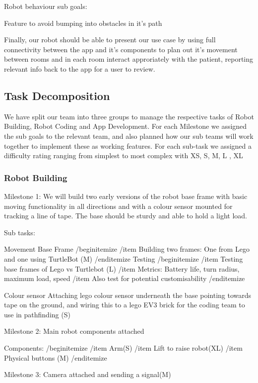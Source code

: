 \documentclass{article}
\begin{document}
Robot behaviour sub goals:

Feature to avoid bumping into obstacles in it's path

Finally, our robot should be able to present our use case by using full connectivity between the app and it's components to plan out it's movement between rooms and in each room interact approriately with the patient, reporting relevant info back to the app for a user to review.


\subsection{Task Decomposition}

We have split our team into three groups to manage the respective tasks of Robot Building, Robot Coding and App Development. For each Milestone we assigned the sub goals to the relevant team, and also planned how our sub teams will work together to implement these as working features.
For each sub-task we assigned a difficulty rating ranging from simplest to most complex with XS, S, M, L , XL


\subsubsection{Robot Building}

Milestone 1: We will build two early versions of the robot base frame with basic moving functionality in all directions and with a colour sensor mounted for tracking a line of tape. The base should be sturdy and able to hold a light load. 

Sub tasks:

Movement Base Frame
/begin{itemize}
/item Building two frames: One from Lego and one using TurtleBot (M)
/end{itemize}
Testing
/begin{itemize}
/item Testing base frames of Lego vs Turtlebot (L)
/item Metrics: Battery life, turn radius, maximum load, speed
/item Also test for potential customisability
/end{itemize}
    
Colour sensor
    Attaching lego colour sensor underneath the base pointing towards tape on the ground, and wiring this to a lego EV3 brick for the       coding team to use in pathfinding (S)
    
Milestone 2: Main robot components attached

Components:
/begin{itemize}
/item Arm(S)
/item Lift to raise robot(XL)
/item Physical buttons (M)
/end{itemize}
    
Milestone 3: Camera attached and sending a signal(M)
\end{document}
